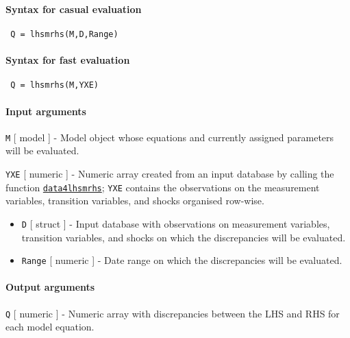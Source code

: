 


	\paragraph{Syntax for casual evaluation}
 
 \begin{verbatim}
 Q = lhsmrhs(M,D,Range)
 \end{verbatim}
 
 \paragraph{Syntax for fast evaluation}
 
 \begin{verbatim}
 Q = lhsmrhs(M,YXE)
 \end{verbatim}
 
 \paragraph{Input arguments}
 
 \texttt{M} {[} model {]} - Model object whose equations and currently
 assigned parameters will be evaluated.
 
 \texttt{YXE} {[} numeric {]} - Numeric array created from an input
 database by calling the function
 \href{model/data4lhsmrhs}{\texttt{data4lhsmrhs}}; \texttt{YXE} contains
 the observations on the measurement variables, transition variables, and
 shocks organised row-wise.
 
 \begin{itemize}
 \item
   \texttt{D} {[} struct {]} - Input database with observations on
   measurement variables, transition variables, and shocks on which the
   discrepancies will be evaluated.
 \item
   \texttt{Range} {[} numeric {]} - Date range on which the discrepancies
   will be evaluated.
 \end{itemize}
 
 \paragraph{Output arguments}
 
 \texttt{Q} {[} numeric {]} - Numeric array with discrepancies between
 the LHS and RHS for each model equation.
 

